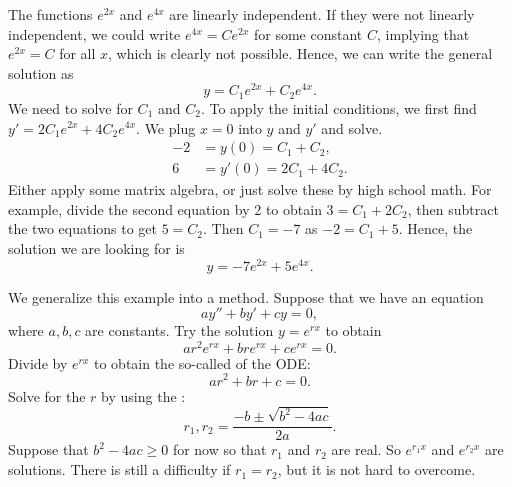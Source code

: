 The functions $e^{2x}$ and $e^{4x}$ are linearly independent.  If they
were not linearly independent, we could write $e^{4x} = C e^{2x}$ for
some constant $C$,
implying that $e^{2x} = C$ for all $x$, which is clearly not possible. 
Hence, we can write the general solution as
\begin{equation*}
y = C_1 e^{2x} + C_2 e^{4x} .
\end{equation*}
We need to solve for $C_1$ and $C_2$.  To apply the initial conditions,
we first find $y' = 2 C_1 e^{2x} + 4 C_2 e^{4x}$.  We plug $x=0$ into
$y$ and $y'$ and solve.
\begin{equation*}
\begin{aligned}
-2 & = y(0) = C_1 + C_2 , \\
6 & = y'(0) = 2 C_1 + 4 C_2 .
\end{aligned}
\end{equation*}
Either apply some matrix algebra, or just solve these by high school
math.  For example, divide the second equation by 2
to obtain $3 = C_1 + 2 C_2$, then subtract the two equations to
get $5 = C_2$.  Then $C_1 = -7$ as $-2 = C_1 + 5$.  Hence, the solution we
are
looking for is
\begin{equation*}
y = -7 e^{2x} + 5 e^{4x} .
\end{equation*}

\medskip

We generalize this example into a method.
Suppose that we have an equation
\begin{equation} \label{ccsol:eq}
a y'' + b y' + c y = 0 ,
\end{equation}
where $a, b, c$ are constants.  Try the solution $y = e^{rx}$ to obtain
\begin{equation*}
a r^2 e^{rx} + 
b r e^{rx} + 
c e^{rx} = 0 .
\end{equation*}
Divide by $e^{rx}$ to obtain the so-called
\emph{} of the ODE:
\begin{equation*}
a r^2 + 
b r + 
c = 0 .
\end{equation*}
Solve for the $r$ by using the :
\begin{equation*}
r_1, r_2 = \frac{-b \pm \sqrt{b^2 - 4ac}}{2a} .
\end{equation*}
Suppose that $b^2 -4ac \geq 0$ for now so that $r_1$ and $r_2$ are real.
So $e^{r_1 x}$ and $e^{r_2 x}$ are solutions.  There is
still a difficulty if $r_1 = r_2$, but it is not hard to overcome.


